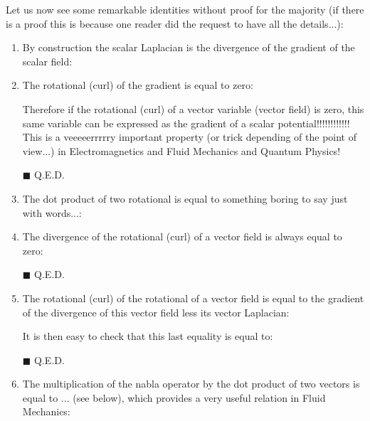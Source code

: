 	Let us now see some remarkable identities without proof for the majority (if there is a proof this is because one reader did the request to have all the details...):
	\begin{enumerate}
		\item By construction the scalar Laplacian is the divergence of the gradient of the scalar field:
		
		
		\item The rotational (curl) of the gradient is equal to zero:
		
		Therefore if the rotational (curl) of a vector variable (vector field) is zero, this same variable can be expressed as the gradient of a scalar potential!!!!!!!!!!!! This is a veeeeerrrrry important property (or trick depending of the point of view...) in Electromagnetics and Fluid Mechanics and Quantum Physics!
		\begin{dem}
		
		\begin{flushright}
			$\blacksquare$  Q.E.D.
		\end{flushright}
		\end{dem}
		
		\item The dot product of two rotational is equal to something boring to say just with words...:
		
		
		\item The divergence of the rotational (curl) of a vector field is always equal to zero:
		
		\begin{dem}
		
		\begin{flushright}
			$\blacksquare$  Q.E.D.
		\end{flushright}
		\end{dem}
		
		\item The rotational (curl) of the rotational  of a vector field is equal to the gradient of the divergence of this vector field less its vector Laplacian:
		
		\begin{dem}
		
		It is then easy to check that this last equality is equal to:
		
		\begin{flushright}
			$\blacksquare$  Q.E.D.
		\end{flushright}
		\end{dem}
		
		\item The multiplication of the nabla operator by the dot product of two vectors is equal to ... (see below), which provides a very useful relation in Fluid Mechanics:
		

\end{enumerate}
